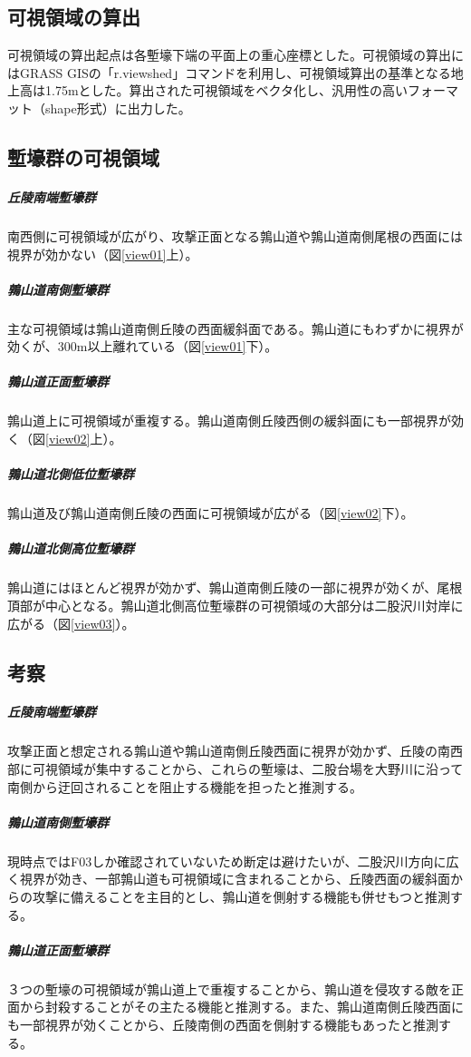 \documentclass[11pt,report]{jsarticle}
\begin{document}
\subsection{可視領域の算出}
可視領域の算出起点は各塹壕下端の平面上の重心座標とした。可視領域の算出にはGRASS GISの「r.viewshed」コマンドを利用し、可視領域算出の基準となる地上高は1.75mとした。算出された可視領域をベクタ化し、汎用性の高いフォーマット（shape形式）に出力した。

\subsection{塹壕群の可視領域}
\subparagraph{丘陵南端塹壕群}
南西側に可視領域が広がり、攻撃正面となる鶉山道や鶉山道南側尾根の西面には視界が効かない（図\ref{view01}上）。

\subparagraph{鶉山道南側塹壕群}
主な可視領域は鶉山道南側丘陵の西面緩斜面である。鶉山道にもわずかに視界が効くが、300m以上離れている（図\ref{view01}下）。

\subparagraph{鶉山道正面塹壕群}
鶉山道上に可視領域が重複する。鶉山道南側丘陵西側の緩斜面にも一部視界が効く（図\ref{view02}上）。

\subparagraph{鶉山道北側低位塹壕群}
鶉山道及び鶉山道南側丘陵の西面に可視領域が広がる（図\ref{view02}下）。

\subparagraph{鶉山道北側高位塹壕群}
鶉山道にはほとんど視界が効かず、鶉山道南側丘陵の一部に視界が効くが、尾根頂部が中心となる。鶉山道北側高位塹壕群の可視領域の大部分は二股沢川対岸に広がる（図\ref{view03}）。

\subsection{考察}
\subparagraph{丘陵南端塹壕群}
攻撃正面と想定される鶉山道や鶉山道南側丘陵西面に視界が効かず、丘陵の南西部に可視領域が集中することから、これらの塹壕は、二股台場を大野川に沿って南側から迂回されることを阻止する機能を担ったと推測する。

\subparagraph{鶉山道南側塹壕群}
現時点ではF03しか確認されていないため断定は避けたいが、二股沢川方向に広く視界が効き、一部鶉山道も可視領域に含まれることから、丘陵西面の緩斜面からの攻撃に備えることを主目的とし、鶉山道を側射する機能も併せもつと推測する。

\subparagraph{鶉山道正面塹壕群}
３つの塹壕の可視領域が鶉山道上で重複することから、鶉山道を侵攻する敵を正面から封殺することがその主たる機能と推測する。また、鶉山道南側丘陵西面にも一部視界が効くことから、丘陵南側の西面を側射する機能もあったと推測する。
\end{document}
